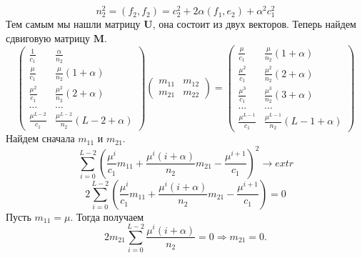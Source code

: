 \documentclass[specialist, substylefile = spbureport.rtx, subf,href,colorlinks=true, 12pt]{disser}
\theoremstyle{definition}
\begin{document}
    \begin{equation*}
        n_2^2 = (f_2, f_2) = c_2^2 + 2\alpha(f_1, e_2) + \alpha^2c_1^2
    \end{equation*}
    Тем самым мы нашли матрицу $\mathbf{U}$, она состоит из двух векторов. Теперь найдем сдвиговую матрицу $\mathbf{M}$.
    \begin{equation*}
        \begin{pmatrix}
            \frac{1}{c_1} & \frac{\alpha}{n_2} \\
            \frac{\mu}{c_1} & \frac{\mu}{n_2}(1+ \alpha) \\
            \frac{\mu^2}{c_1} & \frac{\mu^2}{n_2}(2 + \alpha) \\
            \dots & \dots \\
            \frac{\mu^{L - 2}}{c_1} & \frac{\mu^{L - 2}}{n_2}(L - 2 + \alpha)
        \end{pmatrix}
        \begin{pmatrix}
            m_{11} & m_{12} \\
            m_{21} & m_{22}
        \end{pmatrix}
        =\begin{pmatrix}
            \frac{\mu}{c_1} & \frac{\mu}{n_2}(1 + \alpha) \\
            \frac{\mu^2}{c_1} & \frac{\mu ^ 2}{n_2}(2 + \alpha) \\
            \frac{\mu^3}{c_1} & \frac{\mu^3}{n_2}(3 + \alpha) \\
            \dots & \dots \\
            \frac{\mu^{L - 1}}{c_1} & \frac{\mu^{L - 1}}{n_2}(L - 1 + \alpha)
        \end{pmatrix}
    \end{equation*}
    Найдем сначала $m_{11}$ и $m_{21}$.
    \begin{equation*}
        \sum_{i = 0}^{L - 2}(\frac{\mu^i}{c_1}m_{11} + \frac{\mu^i(i + \alpha)}{n_2}m_{21} - \frac{\mu^{i + 1}}{c_1})^2 \longrightarrow extr
    \end{equation*}
    \begin{equation*}
        2\sum_{i = 0}^{L - 2}(\frac{\mu^i}{c_1}m_{11} + \frac{\mu^i(i + \alpha)}{n_2}m_{21} - \frac{\mu^{i + 1}}{c_1}) = 0 
    \end{equation*}
    Пусть $m_{11} = \mu$. Тогда получаем
    \begin{equation*}
        2m_{21}\sum_{i = 0}^{L - 2}\frac{\mu^i(i + \alpha)}{n_2} = 0 \Rightarrow m_{21} = 0.
    \end{equation*}
\end{document}
